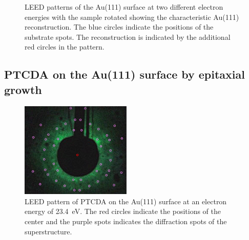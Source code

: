 \documentclass[fontsize=11pt,reqno,a4paper,oneside]{scrartcl}
\begin{document}
\begin{figure}[H]
    \centering
    \hfill

    \caption{\ac{LEED} patterns of the Au(111) surface at two different electron energies with the sample rotated showing the characteristic Au(111) reconstruction. The blue circles indicate the positions of the substrate spots. The reconstruction is indicated by the additional red circles in the pattern.}
    \label{fig:reconstruction}
\end{figure}

\subsection{PTCDA on the Au(111) surface by epitaxial growth}

\begin{figure}
    \centering
    \includegraphics[width=0.47\textwidth]{images/23.4eV-327-329-311-316-233-231-2-((-0.92,4.66),(-7.87,-2.93)).jpg}
    \caption{\ac{LEED} pattern of \ac{PTCDA} on the Au(111) surface at an electron energy of 23.4~\si{eV}. The red circles indicate the positions of the center and the purple spots indicates the diffraction spots of the superstructure.}
    \label{fig:ptcda}
\end{figure}
\end{document}
